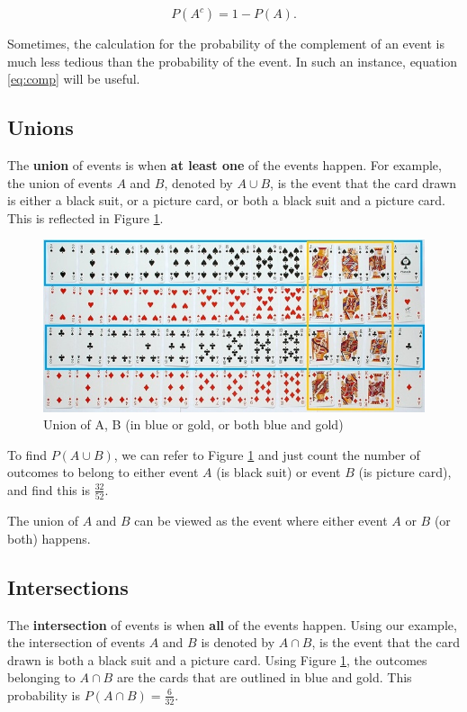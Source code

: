 \documentclass[
]{book}
\begin{document}
\begin{equation} 
P(A^c) = 1 - P(A).
\label{eq:comp}
\end{equation}

Sometimes, the calculation for the probability of the complement of an event is much less tedious than the probability of the event. In such an instance, equation \eqref{eq:comp} will be useful.

\subsection{Unions}\label{unions}

The \textbf{union} of events is when \textbf{at least one} of the events happen. For example, the union of events \(A\) and \(B\), denoted by \(A \cup B\), is the event that the card drawn is either a black suit, or a picture card, or both a black suit and a picture card. This is reflected in Figure \ref{fig:cardsAB}.

\begin{figure}
\centering
\includegraphics{images/02-cardsAB.jpg}
\caption{\label{fig:cardsAB}Union of A, B (in blue or gold, or both blue and gold)}
\end{figure}

To find \(P(A \cup B)\), we can refer to Figure \ref{fig:cardsAB} and just count the number of outcomes to belong to either event \(A\) (is black suit) or event \(B\) (is picture card), and find this is \(\frac{32}{52}\).

The union of \(A\) and \(B\) can be viewed as the event where either event \(A\) or \(B\) (or both) happens.

\subsection{Intersections}\label{intersections}

The \textbf{intersection} of events is when \textbf{all} of the events happen. Using our example, the intersection of events \(A\) and \(B\) is denoted by \(A \cap B\), is the event that the card drawn is both a black suit and a picture card. Using Figure \ref{fig:cardsAB}, the outcomes belonging to \(A \cap B\) are the cards that are outlined in blue and gold. This probability is \(P(A \cap B) = \frac{6}{32}\).
\end{document}
